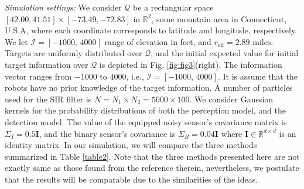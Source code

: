 \documentclass[letterpaper, 10 pt, conference]{ieeeconf}
\begin{document}
\textit{Simulation settings:}
We consider  $\mathcal{Q}$ be a rectangular space $[42.00,41.51]\times [-73.49,-72.83]$ in $\mathbb{R}^2$, some mountain area in Connecticut, U.S.A, where each coordinate corresponds to latitude and longitude, respectively. We let $\mathcal{I} = [-1000,\,4000]$ range of elevation in feet, and $r_{\text{eff}} =2.89$ miles. Targets are uniformly distributed over $\mathcal{Q}$, and the initial expected value for initial target information over $\mathcal{Q}$ is depicted in Fig. \ref{fig:fig3}(right). The information vector ranges from $-1000$ to $4000$, i.e., $\mathcal{I} = [-1000,\,4000]$.
It is assume that the robots have no prior knowledge of the target information.
A number of particles used for the SIR filter is $N= N_1\times N_2 = 5000 \times 100$. We consider Gaussian kernels for the probability distributions of both the perception model, and the detection model. The value of the equipped noisy sensor's covariance matrix is $\Sigma_I = 0.5\mathbf{I}$, and the binary sensor's covariance is $\Sigma_B = 0.04\mathbf{I}$ where $\mathbf{I} \in \mathbb{R}^{d\times d}$ is an identity matrix.
In our simulation, we will compare the three methods summarized in Table \ref{table2}. Note that the three methods presented here are not exactly same as those found from the reference therein, nevertheless, we postulate that the results will be comparable due to the similarities of the ideas.
\begin{table}[]
	\centering
	\caption{Summary of deployment methods considered in current section:}
				\label{table2}	
	{\scriptsize
		}
\end{table}

\end{document}
